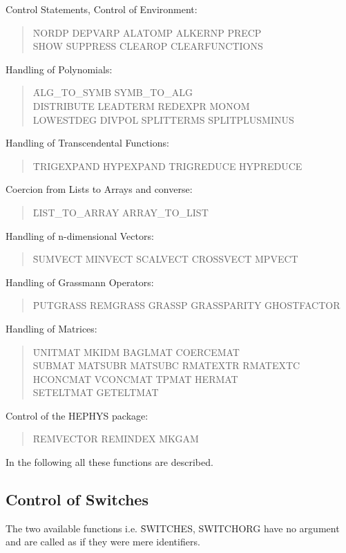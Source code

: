 \begin{itemize}
\item{ Control Statements, Control of Environment:}
\begin{quotation}
\noindent
\f{NORDP DEPVARP ALATOMP ALKERNP PRECP \\
 SHOW SUPPRESS CLEAROP CLEARFUNCTIONS }
\end{quotation}
\item{Handling of Polynomials:}
\begin{quotation}
\noindent
\f{ALG\_TO\_SYMB SYMB\_TO\_ALG \\
DISTRIBUTE LEADTERM REDEXPR MONOM\\
LOWESTDEG DIVPOL SPLITTERMS SPLITPLUSMINUS}
\end{quotation}
\item{Handling of Transcendental Functions:}
\begin{quotation}
\noindent
\f{TRIGEXPAND HYPEXPAND TRIGREDUCE HYPREDUCE}
\end{quotation}
\item{Coercion from Lists to Arrays and converse:}
\begin{quotation}
\f{LIST\_TO\_ARRAY ARRAY\_TO\_LIST}
\end{quotation}
\item{Handling of n-dimensional Vectors:}
\begin{quotation}
\noindent
\f{SUMVECT MINVECT SCALVECT CROSSVECT MPVECT }
\end{quotation}
{\item Handling of Grassmann Operators:}
\begin{quotation}
\noindent
\f{PUTGRASS REMGRASS GRASSP GRASSPARITY GHOSTFACTOR }
\end{quotation}
\item{Handling of Matrices:}
\begin{quotation}
\noindent
\f{UNITMAT MKIDM BAGLMAT COERCEMAT \\
SUBMAT MATSUBR MATSUBC RMATEXTR RMATEXTC \\
 HCONCMAT VCONCMAT TPMAT HERMAT \\
SETELTMAT GETELTMAT}
\end{quotation}
\item{Control of the HEPHYS package:}
\begin{quotation}
\noindent
\f{REMVECTOR REMINDEX MKGAM}
\end{quotation}
\end{itemize}
In the following all these functions are described.
\subsection{Control of Switches}
The two available functions i.e. \f{SWITCHES, SWITCHORG} have
no argument and are called as if they were mere identifiers.

